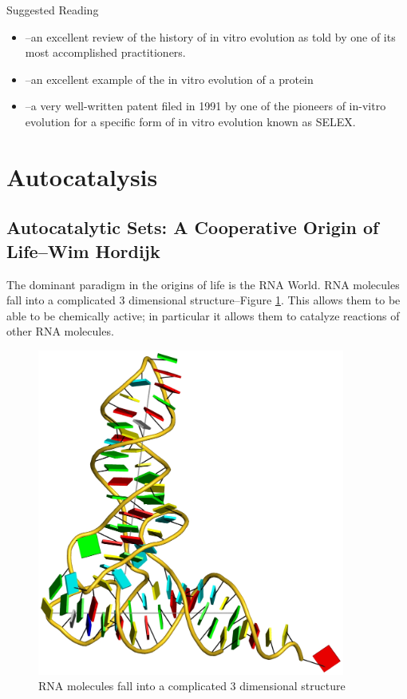 \documentclass[]{article}
\begin{document}
Suggested Reading
\begin{itemize}
	\item \cite{joyce2007forty}--an excellent review of the history of in vitro evolution as told by one of its most accomplished practitioners.
	\item \cite{seelig2007selection}--an excellent example of the in vitro evolution of a protein
	\item \cite{chen2007ribozyme}--a very well-written patent filed in 1991 by one of the pioneers of in-vitro evolution for a specific form of in vitro evolution known as SELEX.
\end{itemize}


\section{Autocatalysis}

\subsection[Autocatalytic Sets: A Cooperative Origin of Life--Wim Hordijk
]{Autocatalytic Sets: A Cooperative Origin of Life--Wim Hordijk}

The dominant paradigm in the origins of life is the RNA World. RNA molecules fall into a complicated 3 dimensional structure--Figure \ref{fig:RNA}. This allows them to be able to be chemically active; in particular it allows them to catalyze reactions of other RNA molecules.

\begin{figure}[H]
	\caption[RNA molecules fall into a complicated 3 dimensional structure]{RNA molecules fall into a complicated 3 dimensional structure\cite{x3dna.org}}\label{fig:RNA} 
	\includegraphics[width=0.9\textwidth]{RNA}
\end{figure}
\end{document}
